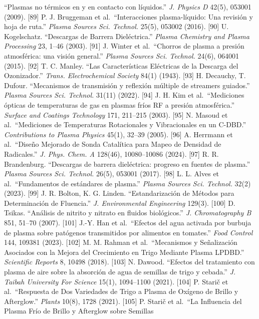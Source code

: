 \documentclass[
  11pt,
  letterpaper,
]{article}
\begin{document}
``Plasmas no térmicos en y en contacto con líquidos.'' \emph{J. Physics
D} 42(5), 053001 (2009). {[}89{]} P. J. Bruggeman et al.~``Interacciones
plasma-líquido: Una revisión y hoja de ruta.'' \emph{Plasma Sources Sci.
Technol.} 25(5), 053002 (2016). {[}90{]} U. Kogelschatz. ``Descargas de
Barrera Dieléctrica.'' \emph{Plasma Chemistry and Plasma Processing} 23,
1--46 (2003). {[}91{]} J. Winter et al.~``Chorros de plasma a presión
atmosférica: una visión general.'' \emph{Plasma Sources Sci. Technol.}
24(6), 064001 (2015). {[}92{]} T. C. Manley. ``Las Características
Eléctricas de la Descarga del Ozonizador.'' \emph{Trans. Electrochemical
Society} 84(1) (1943). {[}93{]} H. Decauchy, T. Dufour. ``Mecanismos de
transmisión y reflexión múltiple de streamers guiados.'' \emph{Plasma
Sources Sci. Technol.} 31(11) (2022). {[}94{]} J. H. Kim et
al.~``Mediciones ópticas de temperaturas de gas en plasmas fríos RF a
presión atmosférica.'' \emph{Surface and Coatings Technology} 171,
211--215 (2003). {[}95{]} N. Masoud et al.~``Mediciones de Temperaturas
Rotacionales y Vibracionales en un C-DBD.'' \emph{Contributions to
Plasma Physics} 45(1), 32--39 (2005). {[}96{]} A. Herrmann et
al.~``Diseño Mejorado de Sonda Catalítica para Mapeo de Densidad de
Radicales.'' \emph{J. Phys. Chem. A} 128(46), 10080--10086 (2024).
{[}97{]} R. R. Brandenburg. ``Descargas de barrera dieléctrica: progreso
en fuentes de plasma.'' \emph{Plasma Sources Sci. Technol.} 26(5),
053001 (2017). {[}98{]} L. L. Alves et al.~``Fundamentos de estándares
de plasma.'' \emph{Plasma Sources Sci. Technol.} 32(2) (2023). {[}99{]}
J. R. Bolton, K. G. Linden. ``Estandarización de Métodos para
Determinación de Fluencia.'' \emph{J. Environmental Engineering} 129(3).
{[}100{]} D. Tsikas. ``Análisis de nitrito y nitrato en fluidos
biológicos.'' \emph{J. Chromatography B} 851, 51--70 (2007). {[}101{]}
J.-Y. Han et al.~``Efectos del agua activada por burbuja de plasma sobre
patógenos transmitidos por alimentos en tomates.'' \emph{Food Control}
144, 109381 (2023). {[}102{]} M. M. Rahman et al.~``Mecanismos y
Señalización Asociados con la Mejora del Crecimiento en Trigo Mediante
Plasma LPDBD.'' \emph{Scientific Reports} 8, 10498 (2018). {[}103{]} N.
Dawood. ``Efectos del tratamiento con plasma de aire sobre la absorción
de agua de semillas de trigo y cebada.'' \emph{J. Taibah University For
Science} 15(1), 1094--1100 (2021). {[}104{]} P. Starič et
al.~``Respuesta de Dos Variedades de Trigo a Plasma de Oxígeno de Brillo
y Afterglow.'' \emph{Plants} 10(8), 1728 (2021). {[}105{]} P. Starič et
al.~``La Influencia del Plasma Frío de Brillo y Afterglow sobre Semillas
\end{document}
